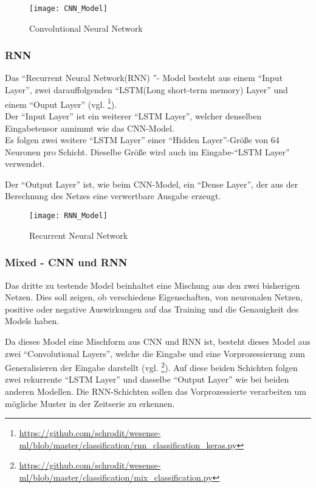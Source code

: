     \begin{figure}[H]
        \centering
        \texttt{[image: CNN\_Model]}
        \caption{Convolutional Neural Network \protect\cite{Tensorboard}}
        \label{fig:CNN_MODEL}
    \end{figure}

    \subsubsection{RNN}
    Das "`Recurrent Neural Network(RNN) "'- Model besteht aus einem "`Input Layer"', zwei darauffolgenden "`LSTM(Long short-term memory) Layer"' und einem "`Ouput Layer"' (vgl. \footnote{\url{https://github.com/schrodit/wesense-ml/blob/master/classification/rnn_classification_keras.py}}).\\
    \noindent
    Der "`Input Layer"' ist ein weiterer "`LSTM Layer"', welcher denselben Eingabetensor annimmt wie das CNN-Model.\\
    \noindent
    Es folgen zwei weitere "`LSTM Layer"' einer "`Hidden Layer"'-Größe von 64 Neuronen pro Schicht.
    Dieselbe Größe wird auch im Eingabe-"`LSTM Layer"' verwendet.
    \newline

    \noindent
    Der "`Output Layer"' ist, wie beim \ac{CNN}-Model, ein "`Dense Layer"', der aus der Berechnung des Netzes eine verwertbare Ausgabe erzeugt.

    \begin{figure}[H]
        \centering
        \texttt{[image: RNN\_Model]}
        \caption{Recurrent Neural Network \protect\cite{Tensorboard}}
        \label{fig:RNN_MODEL}
    \end{figure}

    \subsubsection{Mixed - CNN und RNN}
    Das dritte zu testende Model beinhaltet eine Mischung aus den zwei bisherigen Netzen. 
    Dies soll zeigen, ob verschiedene Eigenschaften, von neuronalen Netzen, positive oder negative Auswirkungen auf das Training und die Genauigkeit des Models haben.
    \newline

    \noindent
    Da dieses Model eine Mischform aus \ac{CNN} und \ac{RNN} ist, besteht dieses Model aus zwei "`Convolutional Layers"', welche die Eingabe und eine Vorprozessierung zum Generalisieren der Eingabe darstellt (vgl. \footnote{\url{https://github.com/schrodit/wesense-ml/blob/master/classification/mix_classification.py}}).
    Auf diese beiden Schichten folgen zwei rekurrente "`LSTM Layer"' und dasselbe "`Output Layer"' wie bei beiden anderen Modellen.
    Die \ac{RNN}-Schichten sollen das Vorprozessierte verarbeiten um mögliche Muster in der Zeitserie zu erkennen.     

